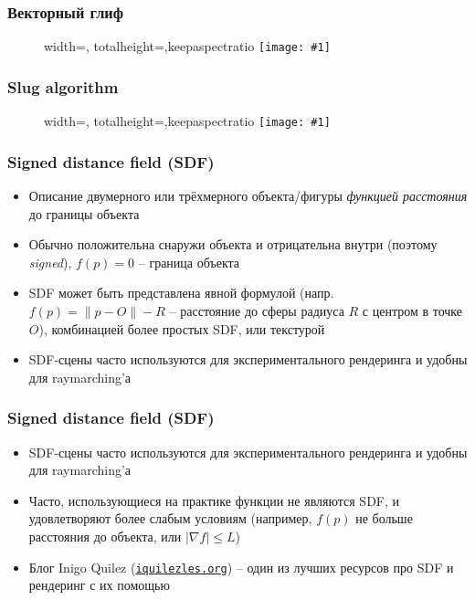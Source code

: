 \documentclass{beamer}
\newcommand{\slideimage}[1]{
  \begin{figure}
    \begin{adjustbox}{width=\textwidth, totalheight=\textheight-2\baselineskip-2\baselineskip,keepaspectratio}
      \texttt{[image: \#1]}
    \end{adjustbox}
  \end{figure}
}
\begin{document}
\begin{frame}[fragile]
\frametitle{Векторный глиф}
\slideimage{vector-glyph.png}
\end{frame}

\begin{frame}[fragile]
\frametitle{Slug algorithm}
\slideimage{slug.jpg}
\end{frame}

\begin{frame}[fragile]
\frametitle{Signed distance field (SDF)}
\begin{itemize}
\item Описание двумерного или трёхмерного объекта/фигуры \textit{функцией расстояния} до границы объекта
\pause
\item Обычно положительна снаружи объекта и отрицательна внутри (поэтому \textit{signed}), \begin{math}f(p) = 0\end{math} -- граница объекта
\pause
\item SDF может быть представлена явной формулой (напр. \begin{math}f(p) = \|p - O\| - R\end{math} -- расстояние до сферы радиуса \begin{math}R\end{math} с центром в точке \begin{math}O\end{math}), комбинацией более простых SDF, или текстурой
\pause
\item SDF-сцены часто используются для экспериментального рендеринга и удобны для raymarching'а
\end{itemize}
\end{frame}

\begin{frame}[fragile]
\frametitle{Signed distance field (SDF)}
\begin{itemize}
\item SDF-сцены часто используются для экспериментального рендеринга и удобны для raymarching'а
\pause
\item Часто, использующиеся на практике функции не являются SDF, и удовлетворяют более слабым условиям (например, \begin{math}f(p)\end{math} не больше расстояния до объекта, или \begin{math}|\nabla f|\leq L\end{math})
\pause
\item Блог Inigo Quilez (\href{https://iquilezles.org/}{\texttt{iquilezles.org}}) -- один из лучших ресурсов про SDF и рендеринг с их помощью
\end{itemize}
\end{frame}
\end{document}
